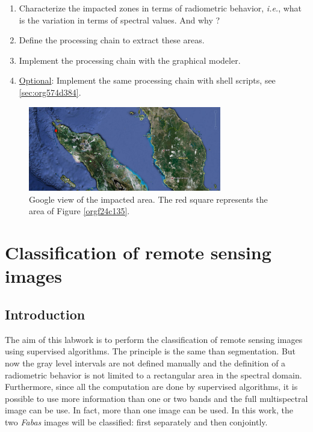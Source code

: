 \documentclass[a4paper,11pt,DIV=18]{scrartcl}
\begin{document}
\begin{work}
\begin{enumerate}
\item Characterize the  impacted zones in terms  of radiometric behavior,
\emph{i.e.}, what is the variation in terms of spectral values. And why ?
\item Define the processing chain to extract these areas.
\item Implement the processing chain with the graphical modeler.
\item \uline{Optional}: Implement  the same processing chain  with shell scripts,
see \ref{sec:org574d384}.
\end{enumerate}
\end{work}

\begin{figure}[htbp]
\centering
\includegraphics[width=0.75\textwidth]{./figures/google_bridge.jpg}
\caption{\label{fig:orgfd6b5e8}
Google view of the impacted area. The red square represents the area of Figure \ref{orgf24c135}.}
\end{figure}

\section{Classification of remote sensing images}
\label{sec:orgfd75932}
\subsection{Introduction}
\label{sec:org24488ff}
The aim  of this labwork  is to  perform the classification  of remote
sensing images using supervised algorithms.  The principle is the same
than segmentation.  But  now the gray level intervals  are not defined
manually and the  definition of a radiometric behavior  is not limited
to a rectangular area in  the spectral domain.  Furthermore, since all
the computation are  done by supervised algorithms, it  is possible to
use more information than one or  two bands and the full multispectral
image can be use.  In fact, more  than one image can be used.  In this
work, the  two \emph{Fabas} images  will be classified: first  separately and
then conjointly.
\end{document}
